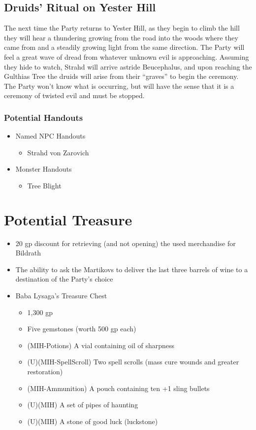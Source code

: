 \documentclass[a4paper,11pt]{article}
\begin{document}
\subsection{Druids' Ritual on Yester Hill}
The next time the Party returns to Yester Hill, as they begin to climb the hill they will hear a thundering 
growing from the road into the woods where they came from and a steadily growing light from the same direction. 
The Party will feel a great wave of dread from whatever unknown evil is approaching. Assuming they hide to watch, 
Strahd will arrive astride Beucephalus, and upon reaching the Gulthias Tree the druids will arise from their 
``graves'' to begin the ceremony. The Party won't know what is occurring, but will have the sense that it is a 
ceremony of twisted evil and must be stopped.
\subsubsection{Potential Handouts}
\begin{itemize}
  \item Named NPC Handouts
  \begin{itemize}
    \item Strahd von Zarovich
  \end{itemize}
  \item Monster Handouts
  \begin{itemize}
    \item Tree Blight
  \end{itemize}
\end{itemize}

\section{Potential Treasure}
\label{sec:PotentialTreasure}
\begin{itemize}
  \item 20 gp discount for retrieving (and not opening) the used merchandise for Bildrath
  \item The ability to ask the Martikovs to deliver the last three barrels of wine to a destination of the 
  Party's choice
  \item Baba Lysaga's Treasure Chest
  \begin{itemize}
    \item 1,300 gp
    \item Five gemstones (worth 500 gp each)
    \item (MIH-Potions) A vial containing oil of sharpness
    \item (U)(MIH-SpellScroll) Two spell scrolls (mass cure wounds and greater restoration)
    \item (MIH-Ammunition) A pouch containing ten +1 sling bullets
    \item (U)(MIH) A set of pipes of haunting
    \item (U)(MIH) A stone of good luck (luckstone)
  \end{itemize}
\end{itemize}
\end{document}
